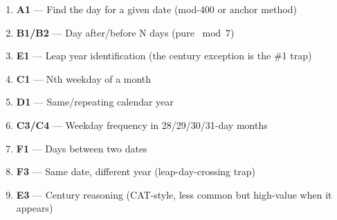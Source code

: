 \documentclass[11pt]{article}
\begin{document}
\begin{enumerate}[leftmargin=1.6em]
  \item \textbf{A1} --- Find the day for a given date (mod-400 or anchor method)
  \item \textbf{B1/B2} --- Day after/before N days (pure $\bmod 7$)
  \item \textbf{E1} --- Leap year identification (the century exception is the \#1 trap)
  \item \textbf{C1} --- Nth weekday of a month
  \item \textbf{D1} --- Same/repeating calendar year
  \item \textbf{C3/C4} --- Weekday frequency in 28/29/30/31-day months
  \item \textbf{F1} --- Days between two dates
  \item \textbf{F3} --- Same date, different year (leap-day-crossing trap)
  \item \textbf{E3} --- Century reasoning (CAT-style, less common but high-value when it appears)
\end{enumerate}
\end{document}
